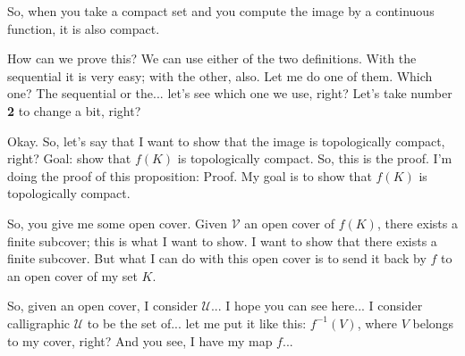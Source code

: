 \begin{speech}[00:29:48 - 00:32:15]
So, when you take a compact set and you compute the image by a continuous function, it is also compact.

How can we prove this? We can use either of the two definitions. With the sequential it is very easy; with the other, also. Let me do one of them. Which one? The sequential or the... let's see which one we use, right? Let's take number \textbf{2} to change a bit, right?

Okay. So, let's say that I want to show that the image is topologically compact, right? Goal:  show that $f(K)$ is topologically compact. So, this is the proof. I'm doing the proof of this proposition: Proof.  My goal is to show that $f(K)$ is topologically compact.

So, you give me some open cover. Given $\mathcal{V}$ an open cover of $f(K)$,  there exists a finite subcover; this is what I want to show. I want to show that there exists a finite subcover. But what I can do with this open cover is to send it back by $f$ to an open cover of my set $K$.

So, given an open cover, I consider $\mathcal{U}$...  I hope you can see here... I consider calligraphic $\mathcal{U}$ to be the set of... let me put it like this: $f^{-1}(V)$, where $V$ belongs to my cover, right? And you see, I have my map $f$...
\end{speech}


